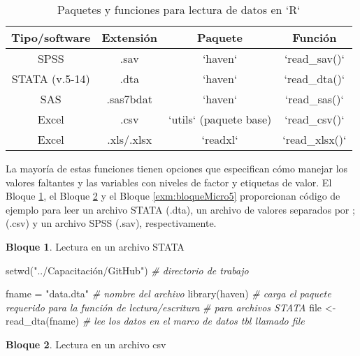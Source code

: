 \documentclass[
]{book}
\newenvironment{Shaded}{\begin{snugshade}}{\end{snugshade}}
\newcommand{\CommentTok}[1]{\textcolor[rgb]{0.56,0.35,0.01}{\textit{#1}}}
\newcommand{\FunctionTok}[1]{\textcolor[rgb]{0.00,0.00,0.00}{#1}}
\newcommand{\NormalTok}[1]{#1}
\newcommand{\OtherTok}[1]{\textcolor[rgb]{0.56,0.35,0.01}{#1}}
\newcommand{\StringTok}[1]{\textcolor[rgb]{0.31,0.60,0.02}{#1}}
\theoremstyle{definition}
\theoremstyle{definition}
\newtheorem{example}{Bloque}[chapter]
\theoremstyle{definition}
\theoremstyle{definition}
\theoremstyle{remark}
\begin{document}
\begin{table}

\caption{\label{tab:tabMicro1}Paquetes y funciones para lectura de datos en `R`}
\centering
\begin{tabular}[t]{c|c|c|c}
\hline
Tipo/software & Extensión & Paquete & Función\\
\hline
SPSS & .sav & `haven` & `read\_sav()`\\
\hline
STATA (v.5-14) & .dta & `haven` & `read\_dta()`\\
\hline
SAS & .sas7bdat & `haven` & `read\_sas()`\\
\hline
Excel & .csv & `utils` (paquete base) & `read\_csv()`\\
\hline
Excel & .xls/.xlsx & `readxl` & `read\_xlsx()`\\
\hline
\end{tabular}
\end{table}

La mayoría de estas funciones tienen opciones que especifican cómo manejar los valores faltantes y las variables con niveles de factor y etiquetas de valor. El Bloque \ref{exm:bloqueMicro3}, el Bloque \ref{exm:bloqueMicro4} y el Bloque \ref{exm:bloqueMicro5} proporcionan código de ejemplo para leer un archivo STATA (.dta), un archivo de valores separados por ; (.csv) y un archivo SPSS (.sav), respectivamente.

\begin{example}
\protect\hypertarget{exm:bloqueMicro3}{}\label{exm:bloqueMicro3}Lectura en un archivo STATA
\end{example}

\begin{Shaded}
\begin{Highlighting}[]
\FunctionTok{setwd}\NormalTok{(}\StringTok{"../Capacitación/GitHub"}\NormalTok{) }\CommentTok{\# directorio de trabajo}


\NormalTok{fname }\OtherTok{=} \StringTok{"data.dta"} \CommentTok{\# nombre del archivo}
\FunctionTok{library}\NormalTok{(haven) }\CommentTok{\# carga el paquete requerido para la función de lectura/escritura}
               \CommentTok{\# para archivos STATA}
\NormalTok{file }\OtherTok{\textless{}{-}} \FunctionTok{read\_dta}\NormalTok{(fname)}
\CommentTok{\# lee los datos en el marco de datos tbl llamado file}
\end{Highlighting}
\end{Shaded}

\begin{example}
\protect\hypertarget{exm:bloqueMicro4}{}\label{exm:bloqueMicro4}Lectura en un archivo csv
\end{example}
\end{document}
